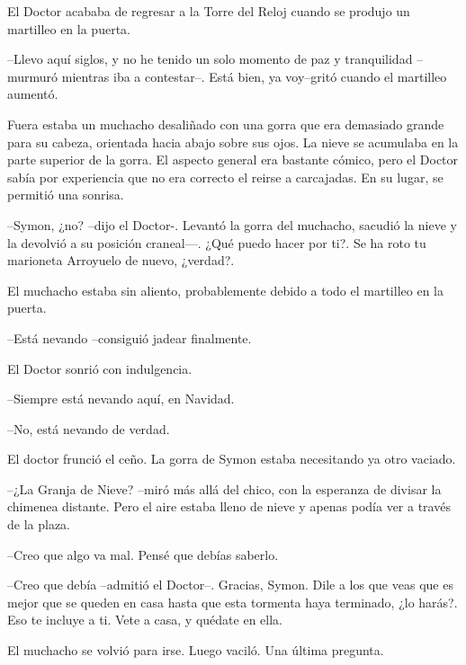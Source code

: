 El Doctor acababa de regresar a la Torre del Reloj cuando se produjo un martilleo en la puerta.



--Llevo aquí siglos, y no he tenido un solo momento de paz y tranquilidad --murmuró mientras iba a contestar--. Está bien, ya voy--gritó cuando el martilleo aumentó.



Fuera estaba un muchacho desaliñado con una gorra que era demasiado grande para su cabeza, orientada hacia abajo sobre sus ojos. La nieve se acumulaba en la parte superior de la gorra. El aspecto general era bastante cómico, pero el Doctor sabía por experiencia que no era correcto el reirse a carcajadas. En su lugar, se permitió una sonrisa.



--Symon, ¿no? --dijo el Doctor-. Levantó la gorra del muchacho, sacudió la nieve y la devolvió a su posición craneal—. ¿Qué puedo hacer por ti?. Se ha roto tu marioneta Arroyuelo de nuevo, ¿verdad?.



El muchacho estaba sin aliento, probablemente debido a todo el martilleo en la puerta.


--Está nevando --consiguió jadear finalmente.



El Doctor sonrió con indulgencia.


--Siempre está nevando aquí, en Navidad.



--No, está nevando de verdad.



El doctor frunció el ceño. La gorra de Symon estaba necesitando ya otro vaciado. 


--¿La Granja de Nieve? --miró más allá del chico, con la esperanza de divisar la chimenea distante. Pero el aire estaba lleno de nieve y apenas podía ver a través de la plaza.



--Creo que algo va mal. Pensé que debías saberlo.



--Creo que debía --admitió el Doctor--. Gracias, Symon. Dile a los que veas que es mejor que se queden en casa hasta que esta tormenta haya terminado, ¿lo harás?. Eso te incluye a ti. Vete a casa, y quédate en ella.



El muchacho se volvió para irse. Luego vaciló. Una última pregunta.


